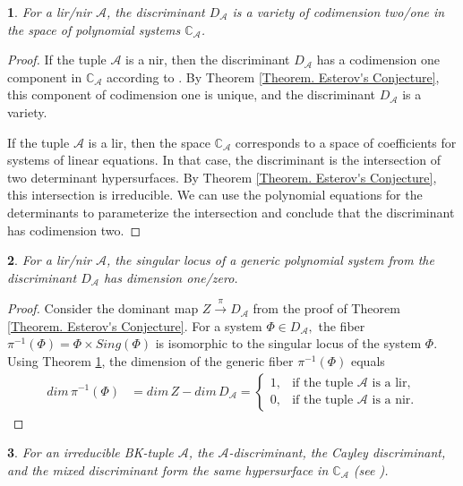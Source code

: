 \documentclass[11pt]{article}
\theoremstyle{plain}
\newtheorem{thm}{\protect\theoremname}[section]
\theoremstyle{definition}
\theoremstyle{remark}
\theoremstyle{plain}
\theoremstyle{plain}
\theoremstyle{plain}
\newtheorem{cor}[thm]{\protect\corollaryname}
\theoremstyle{definition}
\providecommand{\corollaryname}{Corollary}
\providecommand{\theoremname}{Theorem}
\begin{document}
\begin{thm}
\label{Theorem. Codimension of discriminants}For a lir/nir $\mathscr{A}$,
the discriminant $D_{\mathscr{A}}$ is a variety of codimension two/one
in the space of polynomial systems\textup{ $\mathbb{C}_{\mathscr{A}}$.}
\end{thm}

\begin{proof}
If the tuple $\mathscr{A}$ is a nir, then the discriminant $D_{\mathscr{A}}$
has a codimension one component in $\mathbb{C}_{\mathscr{A}}$ according
to \cite{esterov_galois_2019}. By Theorem \ref{Theorem. Esterov's Conjecture},
this component of codimension one is unique, and the discriminant
$D_{\mathscr{A}}$ is a variety.

If the tuple $\mathscr{A}$ is a lir, then the space $\mathbb{C}_{\mathscr{A}}$
corresponds to a space of coefficients for systems of linear equations.
In that case, the discriminant is the intersection of two determinant
hypersurfaces. By Theorem \ref{Theorem. Esterov's Conjecture}, this
intersection is irreducible. We can use the polynomial equations for
the determinants to parameterize the intersection and conclude that
the discriminant has codimension two.
\end{proof}
\begin{cor}
For a lir/nir $\mathscr{A}$, the singular locus of a generic polynomial
system from the discriminant $D_{\mathscr{A}}$ has dimension one/zero.
\end{cor}

\begin{proof}
Consider the dominant map $Z\overset{\pi}{\rightarrow}D_{\mathscr{A}}$
from the proof of Theorem \ref{Theorem. Esterov's Conjecture}. For
a system $\Phi\in D_{\mathscr{A}},$ the fiber $\pi^{-1}(\Phi)=\Phi\times Sing(\Phi)$
is isomorphic to the singular locus of the system $\Phi.$ Using Theorem
\ref{Theorem. Codimension of discriminants}, the dimension of the
generic fiber $\pi^{-1}(\Phi)$ equals 
\begin{align*}
dim\,\pi^{-1}(\Phi) & =dim\,Z-dim\,D_{\mathscr{A}}=\begin{cases}
1, & \text{if the tuple }\mathscr{A}\text{ is a lir,}\\
0, & \text{if the tuple }\mathscr{A}\text{ is a nir.}
\end{cases}
\end{align*}
\end{proof}
\begin{cor}
\label{Corollary. Irreducible BK =00003D> three types of discriminant are equal}For
an irreducible BK-tuple $\mathscr{A}$, the $\mathscr{A}$-discriminant,
the Cayley discriminant, and the mixed discriminant form the same
hypersurface in $\mathbb{C}_{\mathscr{A}}$ \textup{(see \cite{cattani_mixed_2013,esterov_galois_2019})}.
\end{cor}
\end{document}
